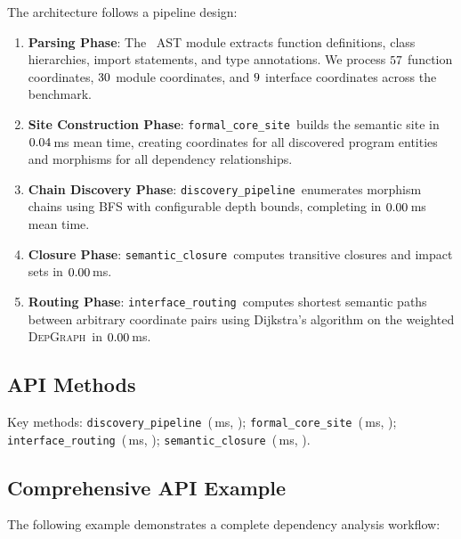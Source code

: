 \documentclass[11pt]{article}
\newcommand{\DepGraph}{\textsc{DepGraph}}
\newcommand{\DiscPipeline}{\texttt{discovery\_pipeline}}
\newcommand{\FormalSite}{\texttt{formal\_core\_site}}
\newcommand{\InterfRoute}{\texttt{interface\_routing}}
\newcommand{\SemClosure}{\texttt{semantic\_closure}}
\begin{document}
The architecture follows a pipeline design:
\begin{enumerate}[noitemsep]
  \item \textbf{Parsing Phase}: The \Python\ AST module extracts function
        definitions, class hierarchies, import statements, and type
        annotations.  We process $57$ function
        coordinates, $30$ module coordinates, and
        $9$ interface coordinates across the
        benchmark.
  \item \textbf{Site Construction Phase}: \FormalSite\ builds the semantic
        site in $0.04$\,ms mean time, creating
        coordinates for all discovered program entities and morphisms for
        all dependency relationships.
  \item \textbf{Chain Discovery Phase}: \DiscPipeline\ enumerates morphism
        chains using BFS with configurable depth bounds, completing in
        $0.00$\,ms mean time.
  \item \textbf{Closure Phase}: \SemClosure\ computes transitive closures
        and impact sets in $0.00$\,ms.
  \item \textbf{Routing Phase}: \InterfRoute\ computes shortest semantic
        paths between arbitrary coordinate pairs using Dijkstra's algorithm
        on the weighted \DepGraph\ in
        $0.00$\,ms.
\end{enumerate}

\subsection{API Methods}
Key methods: \DiscPipeline\ (\compProfDiscoveryPipelineMeanMs\,ms,
\compProfDiscoveryPipelineRate); \FormalSite\ (\compProfFormalCoreSiteMeanMs\,ms,
\compProfFormalCoreSiteRate); \InterfRoute\
(\compProfInterfaceRoutingMeanMs\,ms, \compProfInterfaceRoutingRate);
\SemClosure\ (\compProfSemanticClosureMeanMs\,ms,
\compProfSemanticClosureRate).

\subsection{Comprehensive API Example}

The following example demonstrates a complete dependency analysis workflow:
\end{document}
